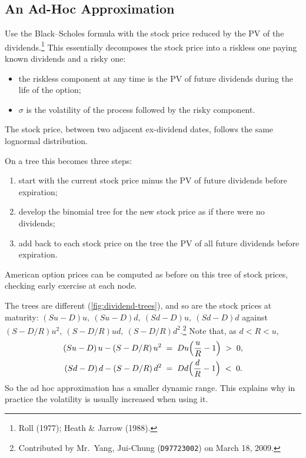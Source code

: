 \subsection{An Ad-Hoc Approximation}
\label{sec:adhoc-dividend}


Use the Black--Scholes formula with the stock price reduced by the PV of the dividends.\footnote{Roll (1977); Heath \& Jarrow (1988).}
This essentially decomposes the stock price into a riskless one paying known dividends and a risky one:
\begin{itemize}[nosep]
	\item the riskless component at any time is the PV of future dividends during the life of the option;
	\item $\sigma$ is the volatility of the process followed by the risky component.
\end{itemize}
The stock price, between two adjacent ex-dividend dates, follows the same lognormal distribution.

On a tree this becomes three steps:
\begin{enumerate}[(1), nosep]
	\item start with the current stock price minus the PV of future dividends before expiration;
	\item develop the binomial tree for the new stock price as if there were no dividends;
	\item add back to each stock price on the tree the PV of all future dividends before expiration.
\end{enumerate}
American option prices can be computed as before on this tree of stock prices, checking early exercise at each node.

The trees are different (\autoref{fig:dividend-trees}), and so are the stock prices at maturity: $(Su-D)u,\ (Su-D)d,\ (Sd-D)u,\ (Sd-D)d$ against $(S-D/R)u^{2},\ (S-D/R)ud,\ (S-D/R)d^{2}$.\footnote{Contributed by Mr.~Yang, Jui-Chung (\texttt{D97723002}) on March 18, 2009.}
Note that, as $d<R<u$,
\begin{align*}
	(Su-D)\,u-(S-D/R)\,u^{2} & \;=\; Du\Bigl(\frac{u}{R}-1\Bigr) \;>\; 0 , \\
	(Sd-D)\,d-(S-D/R)\,d^{2} & \;=\; Dd\Bigl(\frac{d}{R}-1\Bigr) \;<\; 0 .
\end{align*}
So the ad hoc approximation has a smaller dynamic range.
This explains why in practice the volatility is usually increased when using it.

